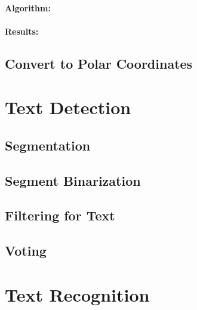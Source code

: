\paragraph*{Algorithm:}\mbox{}\par

\paragraph*{Results:}\mbox{}\par



\subsection{Convert to Polar Coordinates}


\section{Text Detection}\label{sec:text-detection}

\subsection{Segmentation}

\subsection{Segment Binarization}

\subsection{Filtering for Text}

\subsection{Voting}

\section{Text Recognition}\label{sec:text-recognition}



